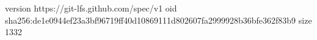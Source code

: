 version https://git-lfs.github.com/spec/v1
oid sha256:de1e0944ef23a3bf96719ff40d10869111d802607fa2999928b36bfe362f83b9
size 1332
